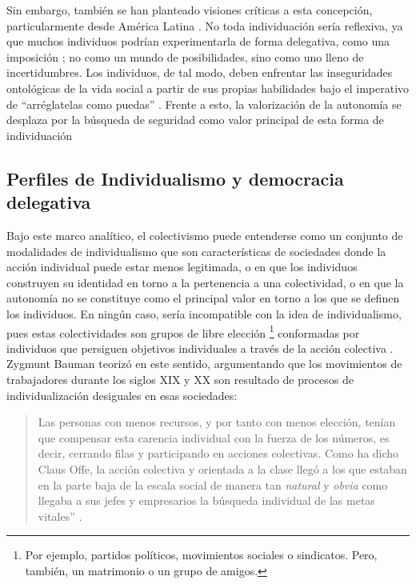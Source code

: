 \documentclass[12pt,twoside]{templates/facsothesis}
\begin{document}
Sin embargo, también se han planteado visiones críticas a esta concepción, particularmente desde América Latina \citep{araujo2012, robles2001}. No toda individuación sería reflexiva, ya que muchos individuos podrían experimentarla de forma delegativa, como una imposición \citep{silvapalacios2015}; no como un mundo de posibilidades, sino como uno lleno de incertidumbres. Los individuos, de tal modo, deben enfrentar las inseguridades ontológicas de la vida social a partir de sus propias habilidades bajo el imperativo de ``arréglatelas como puedas'' \citep{araujo2014, robles2001}. Frente a esto, la valorización de la autonomía se desplaza por la búsqueda de seguridad como valor principal de esta forma de individuación \citep{silvapalacios2015}

\hypertarget{perfiles-de-individualismo-y-democracia-delegativa}{%
\subsection{Perfiles de Individualismo y democracia delegativa}\label{perfiles-de-individualismo-y-democracia-delegativa}}

Bajo este marco analítico, el colectivismo puede entenderse como un conjunto de modalidades de individualismo que son características de sociedades donde la acción individual puede estar menos legitimada, o en que los individuos construyen su identidad en torno a la pertenencia a una colectividad, o en que la autonomía no se constituye como el principal valor en torno a los que se definen los individuos. En ningún caso, sería incompatible con la idea de individualismo, pues estas colectividades son grupos de libre elección \footnote{Por ejemplo, partidos políticos, movimientos sociales o sindicatos. Pero, también, un matrimonio o un grupo de amigos.} conformadas por individuos que persiguen objetivos individuales a través de la acción colectiva \citep{arribas1999, moemeka1998}. Zygmunt Bauman teorizó en este sentido, argumentando que los movimientos de trabajadores durante los siglos XIX y XX son resultado de procesos de individualización desiguales en esas sociedades:

\begin{quote}
Las personas con menos recursos, y por tanto con menos elección, tenían que compensar esta carencia individual con la fuerza de los números, es decir, cerrando filas y participando en acciones colectivas. Como ha dicho Claus Offe, la acción colectiva y orientada a la clase llegó a los que estaban en la parte baja de la escala social de manera tan \emph{natural} y \emph{obvia} como llegaba a sus jefes y empresarios la búsqueda individual de las metas vitales'' \citep[p.~23]{bauman2003}.
\end{quote}
\end{document}
